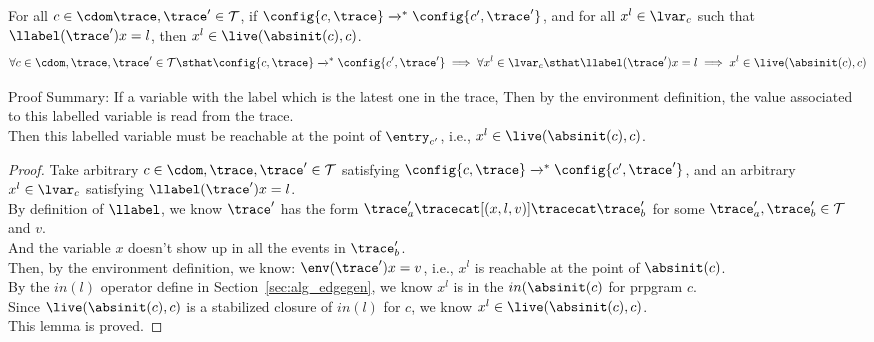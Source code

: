 \begin{lem}
\label{lem:inv_live}
For all $c \in \cdom \trace, \trace' \in \mathcal{T} $, if 
$\config{c, \trace} \xrightarrow{}^* \config{c', \trace'}$,
and for all $x^l \in \lvar_c$ such that 
$\llabel(\trace') x = l $, then $x^l \in \live(\absinit(c), c)$.
%
\[
	\forall c \in \cdom , \trace, \trace' \in \mathcal{T} \sthat 
	\config{c, \trace} \xrightarrow{}^* \config{c', \trace'}
	\implies
	\forall x^l \in \lvar_c \sthat  \llabel(\trace') x = l \implies x^l \in \live(\absinit(c), c)
\]
\end{lem}
Proof Summary: 
If a variable with the label which is the latest one in the trace,
Then by the environment definition, the value associated to this labelled variable is read from the trace.
\\
Then this labelled variable must be reachable at the point of $\entry_{c'}$, i.e., 
$x^l \in \live(\absinit(c), c)$.
\begin{proof}
	Take arbitrary $c \in \cdom , \trace, \trace' \in \mathcal{T}$ satisfying 
	$\config{c, \trace} \xrightarrow{}^* \config{c', \trace'}$, 
	and an arbitrary $x^l \in \lvar_c$ satisfying $\llabel(\trace') x = l$.
	\\
	By definition of $\llabel$, we know $\trace'$ has the form $\trace'_{a} \tracecat [(x, l, v)] \tracecat \trace_{b}'$
	for some $\trace'_{a} , \trace_{b}' \in \mathcal{T}$ and $v$.
	\\
	And the variable $x$ doesn't show up in all the events in $\trace_b'$.
%
\\
	Then, by the environment definition, we know:
	$\env(\trace') x = v$, i.e., $x^l$ is 
	reachable at the point of 
	$\absinit(c)$.
	\\
	By the $in(l)$ operator define in Section~\ref{sec:alg_edgegen}, we know $x^l$ is in the $in(\absinit(c)$ for prpgram $c$.
	\\
	Since $\live(\absinit(c), c)$ is a stabilized closure of $in(l)$ for $c$,
	we know 
	$x^l \in \live(\absinit(c), c)$.
	\\
	This lemma is proved.
\end{proof}